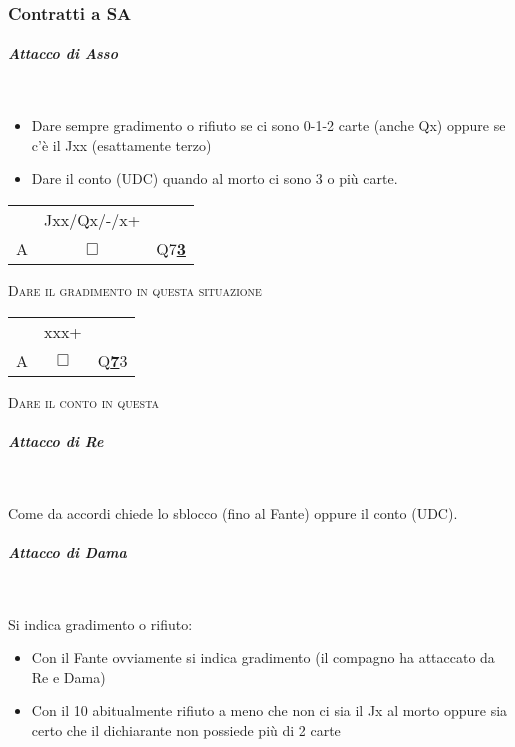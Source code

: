 \documentclass[a4paper,italian]{article}
\newcommand{\cards}[1]{\textrm{#1}}
\newcommand\onesuitenw[3]%
{%
    \begin{center}%
        \begin{tabular}{>{\hfill}p{3cm}cp{3cm}}%
                & \cards{#2} \\%
            \cards{#1}& $\Box$    & \cards{#3}%
        \end{tabular}%
    \end{center}%
}
\begin{document}
\subsubsection{Contratti a SA}

\paragraph{\textit{Attacco di Asso}}\mbox{}\\
\vspace{-.4cm}
\begin{itemize}
    \item Dare sempre gradimento o rifiuto se ci sono 0-1-2 carte (anche Qx) oppure se c’è il Jxx
        (esattamente terzo)
    \item Dare il conto (UDC) quando al morto ci sono 3 o più carte.
\end{itemize}
\smallbreak

    \onesuitenw{A}{Jxx/Qx/-/x+}{Q7\underline{\textbf{3}}}
    \vspace{5pt}

    \begin{center}
        \textsc{Dare il gradimento in questa situazione}
    \end{center}

    \vspace{10pt}

    \onesuitenw{A}{xxx+}{Q\underline{\textbf{7}}3}
    \vspace{5pt}

    \begin{center}
        \textsc{Dare il conto in questa}
    \end{center}

\paragraph{\textit{Attacco di Re}}\mbox{}\\
\vspace{-.4cm}

Come da accordi chiede lo sblocco (fino al Fante) oppure il conto (UDC).

\paragraph{\textit{Attacco di Dama}}\mbox{}\\
\vspace{-.4cm}

Si indica gradimento o rifiuto:
\begin{itemize}
    \item Con il Fante ovviamente si indica gradimento (il compagno ha
        attaccato da Re e Dama)
    \item Con il 10 abitualmente rifiuto a meno che non ci sia il Jx al morto oppure sia certo che il dichiarante non possiede più di 2 carte
\end{itemize}
\newpage
\setlength{\columnseprule}{1pt}
\def\columnseprulecolor{\color{black}}
\end{document}
